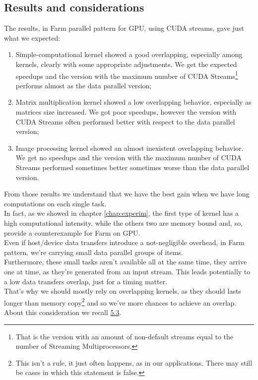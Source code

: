  \subsection{Results and considerations}
 The results, in Farm parallel pattern for GPU, using CUDA streams, gave just what we expected:
 \begin{enumerate}
 	\item Simple-computational kernel showed a good overlapping, especially among kernels, clearly with some appropriate adjustments. We get the expected speedups and the version with the maximum number of CUDA Streams\footnote{That is the version with an amount of non-default streams equal to the number of Streaming Multiprocessors.} performs almost as the data parallel version;
 	
 	
 	
 	\item Matrix multiplication kernel showed a low overlapping behavior, especially as matrices size increased. We got poor speedups, however the version with CUDA Streams often performed better with respect to the data parallel version;
 	
 	
 	
 	\item Image processing kernel showed an almost inexistent overlapping behavior. We get no speedups and the version with the maximum number of CUDA Streams performed sometimes better sometimes worse than the data parallel version.
 \end{enumerate}

 From those results we understand that we have the best gain when we have long computations on each single task.\\
 In fact, as we showed in chapter \ref{chap:experim}, the first type of kernel has a high computational intensity, while the others two are memory bound and, so, provide a counterexample for Farm on GPU.\\

  Even if host/device data transfers introduce a not-negligible overhead, in Farm pattern, we're carrying small data parallel groups of items.\\ Furthermore, these small tasks aren't available all at the same time, they arrive one at time, as they're generated from an input stream.
 This leads potentially to a low data transfers overlap, just for a timing matter.\\ 
 That's why we should mostly rely on overlapping kernels, as they should lasts longer than memory copy\footnote{This isn't a rule, it just often happens, as in our applications. There may still be cases in which this statement is false.} and so we've more chances to achieve an overlap.\\
 About this consideration we recall \hyperref[fig:cosprofiling]{5.3}.
 
